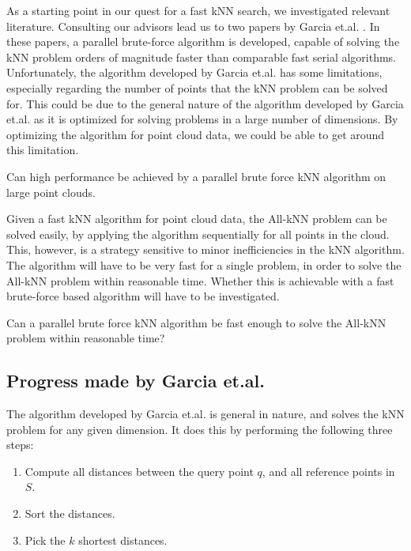 As a starting point in our quest for a fast kNN search, we investigated relevant literature. Consulting our advisors lead us to two papers by Garcia et.al. \citep{Garcia2008, Garcia2010}. In these papers, a parallel brute-force algorithm is developed, capable of solving the kNN problem orders of magnitude faster than comparable fast serial algorithms. Unfortunately, the algorithm developed by Garcia et.al. has some limitations, especially regarding the number of points that the kNN problem can be solved for. This could be due to the general nature of the algorithm developed by Garcia et.al. as it is optimized for solving problems in a large number of dimensions. By optimizing the algorithm for point cloud data, we could be able to get around this limitation.

\begin{myrq}
    Can high performance be achieved by a parallel brute force kNN algorithm on large point clouds.
    \label{rq:brute_force_performance}
\end{myrq}

Given a fast kNN algorithm for point cloud data, the All-kNN problem can be solved easily, by applying the algorithm sequentially for all points in the cloud. This, however, is a strategy sensitive to minor inefficiencies in the kNN algorithm. The algorithm will have to be very fast for a single problem, in order to solve the All-kNN problem within reasonable time. Whether this is achievable with a fast brute-force based algorithm will have to be investigated.

\begin{myrq}
    Can a parallel brute force kNN algorithm be fast enough to solve the All-kNN problem within reasonable time?
    \label{rq:brute_force_Q-kNN}
\end{myrq}

\subsection{Progress made by Garcia et.al.} %
\label{sub:garcia_s_effort}

The algorithm developed by Garcia et.al. is general in nature, and solves the kNN problem for any given dimension. It does this by performing the following three steps:

\begin{enumerate}
       \item Compute all distances between the query point $q$, and all reference points in $S$.
       \item Sort the distances.
       \item Pick the $k$ shortest distances.
\end{enumerate}

